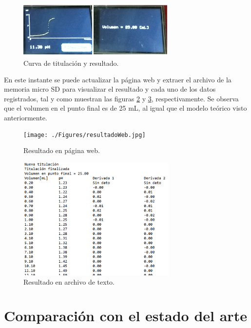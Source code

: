 \begin{figure}[htbp]
	\centering
	\includegraphics[width=0.7\textwidth]{./Figures/casoParte3.png}
	\caption{Curva de titulación y resultado.}
	\label{fig:casoParte3}
\end{figure}

En este instante se puede actualizar la página web y extraer el archivo de la memoria micro SD para visualizar el resultado y cada uno de los datos registrados, tal y como muestran las figuras \ref{fig:resultadoWeb.jpg} y \ref{fig:resultadoSD}, respectivamente. Se observa que el volumen en el punto final es de 25 mL, al igual que el modelo teórico visto anteriormente.

\begin{figure}[htbp]
	\centering
	\texttt{[image: ./Figures/resultadoWeb.jpg]}
	\caption{Resultado en página web.}
	\label{fig:resultadoWeb.jpg}
\end{figure}

\begin{figure}[htbp]
	\centering
	\includegraphics[width=0.7\textwidth]{./Figures/resultadoSD.png}
	\caption{Resultado en archivo de texto.}
	\label{fig:resultadoSD}
\end{figure}


\section{Comparación con el estado del arte}

